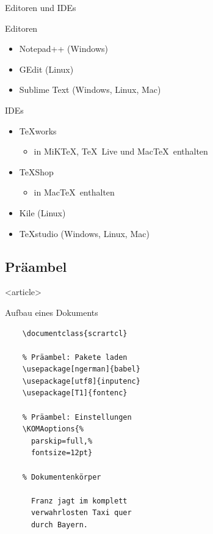 \begin{Frame}{Editoren und IDEs}
  \begin{Block}{Editoren}
    \begin{itemize}
      \item Notepad++ (Windows)
      \item GEdit (Linux)
      \item Sublime Text (Windows, Linux, Mac)
    \end{itemize}
  \end{Block}

  \pause

  \begin{Block}{IDEs}
    \begin{itemize}
      \item \TeX works
        \begin{itemize}
          \item in MiK\TeX, \TeX\ Live und Mac\TeX\ enthalten
        \end{itemize}
      \item \TeX Shop
        \begin{itemize}
          \item in Mac\TeX\ enthalten
        \end{itemize}
      \item Kile (Linux)
      \item TeXstudio (Windows, Linux, Mac)
    \end{itemize}
  \end{Block}
\end{Frame}

\malte


\subsection{Präambel}

\mode
<article>

\begin{Frame}[fragile]{Aufbau eines Dokuments}
  \begin{lstlisting}[gobble=4]
    % Dokumentenklasse
    \documentclass{scrartcl}

    % Präambel: Pakete laden
    \usepackage[ngerman]{babel}
    \usepackage[utf8]{inputenc}
    \usepackage[T1]{fontenc}

    % Präambel: Einstellungen
    \KOMAoptions{%
      parskip=full,%
      fontsize=12pt}

    % Dokumentenkörper
    
      Franz jagt im komplett
      verwahrlosten Taxi quer
      durch Bayern.
    
  \end{lstlisting}
\end{Frame}

